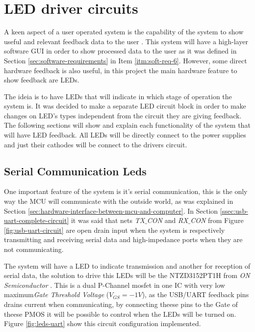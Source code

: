 \section{LED driver circuits}\label{sec:led-driver-circuit}

	A keen aspect of a user operated system is the capability of the system to show useful and relevant feedback data to the user \cite{laurel1990art}. This system will have a high-layer software GUI in order to show processed data to the user as it was defined in Section \ref{sec:software-requirements} in Item \ref{itm:soft-req-6}. However, some direct hardware feedback is also useful, in this project the main hardware feature to show feedback are LEDs.
	\par
	The ideia is to have LEDs that will indicate in which stage of operation the system is. It was decided to make a separate LED circuit block in order to make changes on LED's types independent from the circuit they are giving feedback. The following sections will show and explain each functionality of the system that will have LED feedback. All LEDs will be directly connect to the power supplies and just their cathodes will be connect to the drivers circuit.
		
	\subsection{Serial Communication Leds}\label{ssec:serial-communication-leds}
		One important feature of the system is it's serial communication, this is the only way the MCU will communicate with the outside world, as was explained in Section \ref{sec:hardware-interface-between-mcu-and-computer}. In Section \ref{ssec:usb-uart-complete-circuit} it was said that nets \textit{TX$\_$CON} and \textit{RX$\_$CON} from Figure \ref{fig:usb-uart-circuit} are open drain input when the system is respectively transmitting and receiving serial data and high-impedance ports when they are not communicating.
		\par
		The system will have a LED to indicate transmission and another for reception of serial data, the solution to drive this LEDs will be the NTZD3152PT1H from \textit{ON Semiconductor} \cite{ntzd3152pt1h-datasheet}. This is a dual P-Channel mosfet in one IC with very low maximum\textit{Gate Threshold Voltage} ($V_{GS}=-1V$), as the USB/UART feedback pins drains current when communicating, by connecting theese pins to the Gate of theese PMOS it will be possible to control when the LEDs will be turned on. Figure \ref{fig:leds-uart} show this circuit configuration implemented.

